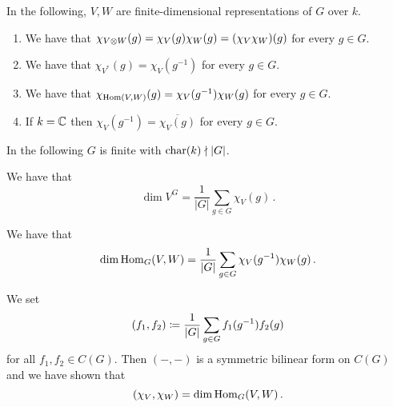 \begin{conventions}
  In the following, $V, W$ are finite-dimensional representations of $G$ over $k$.
\end{conventions}

\begin{lemma}
  \label{lemma: more characters for groups}
  \leavevmode
  \begin{enumerate}
    \item
      We have that $\chi_{V \mathbin{\otimes} W}(g) = \chi_V(g) \chi_W(g) = (\chi_V \chi_W)(g)$ for every $g \in G$.
    \item
      We have that $\chi_{V^*}(g) = \chi_V(g^{-1})$ for every $g \in G$.
    \item
      We have that $\chi_{\operatorname{Hom}(V, W)}(g) = \chi_V(g^{-1}) \chi_W(g)$ for every $g \in G$.
    \item
      If $k = \mathbb{C}$ then $\chi_V(g^{-1}) = \overline{\chi_V(g)}$ for every $g \in G$.
  \end{enumerate}
\end{lemma}


\begin{conventions}
  In the following $G$ is finite with $\operatorname{char}(k) \nmid |G|$.
\end{conventions}


\begin{lemma}
  We have that
  \[
      \dim V^G
    = \frac{1}{|G|} \sum_{g \in G} \chi_V(g) \,.
  \]
\end{lemma}


\begin{corollary}
  We have that
  \[
      \dim \operatorname{Hom}_G(V,W)
    = \frac{1}{|G|} \sum_{g \in G} \chi_V(g^{-1}) \chi_W(g) \,.
  \]
\end{corollary}


\begin{fluff}
  We set
  \[
              (f_1, f_2)
    \coloneqq  \frac{1}{|G|} \sum_{g \in G} f_1(g^{-1}) f_2(g)
  \]
  for all $f_1, f_2 \in C(G)$.
  Then $(-,-)$ is a symmetric bilinear form on $C(G)$ and we have shown that
  \[
      (\chi_V, \chi_W)
    = \dim \operatorname{Hom}_G(V,W) \,.
  \]
\end{fluff}


